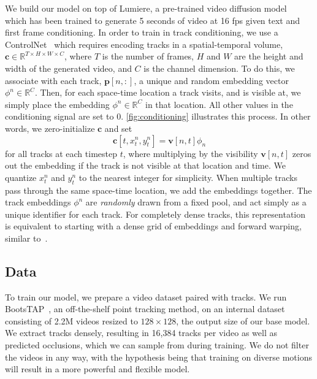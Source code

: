 We build our model on top of Lumiere, a pre-trained video diffusion model~\cite{bar2024lumiere} which has been trained to generate 5 seconds of video at 16 fps given text and first frame conditioning.
In order to train in track conditioning, we use a ControlNet~\cite{zhang2023adding} which requires encoding tracks in a spatial-temporal volume, $\mathbf{c} \in \mathbb{R}^{T \times H \times W \times C}$, where $T$ is the number of frames, $H$ and $W$ are the height and width of the generated video, and $C$ is the channel dimension. To do this, we associate with each track, $\mathbf{p}[n, :]$, a unique and random embedding vector $\phi^n \in \mathbb{R}^C$. Then, for each space-time location a track visits, and is visible at, we simply place the embedding $\phi^n \in \mathbb{R}^C$ in that location. All other values in the conditioning signal are set to 0.
\cref{fig:conditioning} illustrates this process. In other words, we zero-initialize $\mathbf{c}$ and set
\begin{equation}
    \mathbf{c}[t, x_t^n, y_t^n] = \mathbf{v}[n,t] \phi_n
\end{equation} 
for all tracks at each timestep $t$, where multiplying by the visibility $\mathbf{v}[n, t]$ zeros out the embedding if the track is not visible at that location and time. We quantize $x_t^n$ and $y_t^n$ to the nearest integer for simplicity. When multiple tracks pass through the same space-time location, we add the embeddings together. 
The track embeddings $\phi^n$ are {\it randomly} drawn from a fixed pool, and act simply as a unique identifier for each track. %
For completely dense tracks, this representation is equivalent to starting with a dense grid of embeddings and forward warping, similar to~\cite{seo2024genwarp}. 





\subsection{Data}

To train our model, we prepare a video dataset paired with tracks. We run BootsTAP~\cite{doersch2024bootstap}, an off-the-shelf point tracking method, on an internal dataset consisting of 2.2M videos resized to $128 \times 128$, the output size of our base model. 
We extract tracks densely, resulting in 16,384 tracks per video as well as predicted occlusions, which we can sample from during training. We do not filter the videos in any way, with the hypothesis being that training on diverse motions will result in a more powerful and flexible model. 


